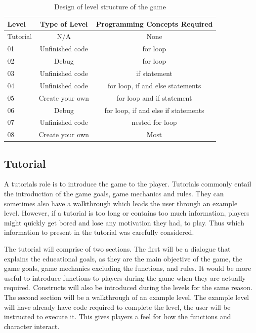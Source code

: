 \documentclass[a4paper,11.5pt]{report}
\numberwithin{figure}{section}
\numberwithin{table}{section}
\numberwithin{equation}{section}
\numberwithin{equation}{section}
\begin{document}
\begin{table}[H]
\centering
  \captionsetup{justification=centering}
\caption{Design of level structure of the game}
\label{tab:leveldesign}
\begin{tabular}{l|c|c}
Level   & Type of Level   & Programming Concepts Required               \\ \hline
Tutorial  & N/A                & None              \\ \hline
01	& Unfinished code & for loop	\\ \hline
02	& Debug	& for loop	\\ \hline
03 & Unfinished code & if statement \\ \hline
04 & Unfinished code & for loop, if and else statements \\ \hline
05 & Create your own & for loop and if statement \\ \hline
06 & Debug & for loop, if and else if statements \\ \hline
07 & Unfinished code & nested for loop \\ \hline
08 & Create your own & Most
\end{tabular}
\end{table}


\subsection{Tutorial}

A tutorials role is to introduce the game to the player. Tutorials commonly entail the introduction of the game goals, game mechanics and rules. They can sometimes also have a walkthrough which leads the user through an example level. However, if a tutorial is too long or contains too much information, players might quickly get bored and lose any motivation they had, to play. Thus which information to present in the tutorial was carefully considered.

The tutorial will comprise of two sections. The first will be a dialogue that explains the educational goals, as they are the main objective of the game, the game goals, game mechanics excluding the functions, and rules. It would be more useful to introduce functions to players during the game when they are actually required. Constructs will also be introduced during the levels for the same reason. The second section will be a walkthrough of an example level. The example level will have already have code required to complete the level, the user will be instructed to execute it. This gives players a feel for how the functions and character interact.
\end{document}
